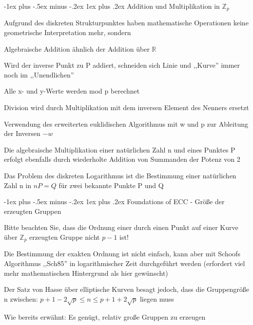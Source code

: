 \documentclass[a4paper]{article}
\makeatletter
\renewcommand{\subsubsection}{\@startsection{subsubsection}{3}{0mm}%
 {-1ex plus -.5ex minus -.2ex}%
 {1ex plus .2ex}%
 {\normalfont\small\bfseries}}
\makeatother
\begin{document}
\begin{multicols}{3}
      \subsubsection{Addition und Multiplikation in $\mathbb{Z}_p$}
      \begin{itemize*}
            \item Aufgrund des diskreten Strukturpunktes haben mathematische Operationen keine geometrische Interpretation mehr, sondern
            \item Algebraische Addition ähnlich der Addition über $\mathbb{R}$
            \item Wird der inverse Punkt zu P addiert, schneiden sich Linie und ,,Kurve'' immer noch im ,,Unendlichen''
            \item Alle x- und y-Werte werden mod p berechnet
            \item Division wird durch Multiplikation mit dem inversen Element des Nenners ersetzt
            \item Verwendung des erweiterten euklidischen Algorithmus mit w und p zur Ableitung der Inversen $-w$
            \item Die algebraische Multiplikation einer natürlichen Zahl n und eines Punktes P erfolgt ebenfalls durch wiederholte Addition von Summanden der Potenz von 2
            \item Das Problem des diskreten Logarithmus ist die Bestimmung einer natürlichen Zahl n in $nP=Q$ für zwei bekannte Punkte P und Q
      \end{itemize*}

      \subsubsection{Foundations of ECC - Größe der erzeugten Gruppen}
      \begin{itemize*}
            \item Bitte beachten Sie, dass die Ordnung einer durch einen Punkt auf einer Kurve über $\mathbb{Z}_p$ erzeugten Gruppe nicht $p-1$ ist!
            \item Die Bestimmung der exakten Ordnung ist nicht einfach, kann aber mit Schoofs Algorithmus ,,Sch85'' in logarithmischer Zeit durchgeführt werden (erfordert viel mehr mathematischen Hintergrund als hier gewünscht)
            \item Der Satz von Hasse über elliptische Kurven besagt jedoch, dass die Gruppengröße n zwischen: $p+1 - 2\sqrt{p}\leq n\leq p+1+2\sqrt{p}$ liegen muss \item Wie bereits erwähnt: Es genügt, relativ große Gruppen zu erzeugen
      \end{itemize*}


\end{multicols}
\end{document}
